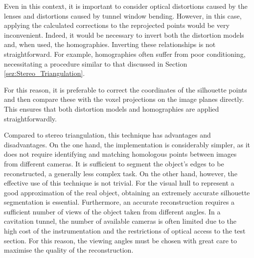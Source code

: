 Even in this context, it is important to consider optical distortions caused by the lenses and distortions caused by tunnel window bending. 
However, in this case, applying the calculated corrections to the reprojected points would be very inconvenient. Indeed, it would be necessary to invert both the distortion models and, when used, the homographies.
Inverting these relationships is not straightforward. For example, homographies often suffer from poor conditioning, necessitating a procedure similar to that discussed in Section \ref{sez:Stereo_Triangulation}.

For this reason, it is preferable to correct the coordinates of the silhouette points and then compare these with the voxel projections on the image planes directly. This ensures that both distortion models and homographies are applied straightforwardly.

Compared to stereo triangulation, this technique has advantages and disadvantages.
On the one hand, the implementation is considerably simpler, as it does not require identifying and matching homologous points between images from different cameras. It is sufficient to segment the object's edges to be reconstructed, a generally less complex task.
On the other hand, however, the effective use of this technique is not trivial. For the visual hull to represent a good approximation of the real object, obtaining an extremely accurate silhouette segmentation is essential. Furthermore, an accurate reconstruction requires a sufficient number of views of the object taken from different angles.
In a cavitation tunnel, the number of available cameras is often limited due to the high cost of the instrumentation and the restrictions of optical access to the test section. For this reason, the viewing angles must be chosen with great care to maximise the quality of the reconstruction.

